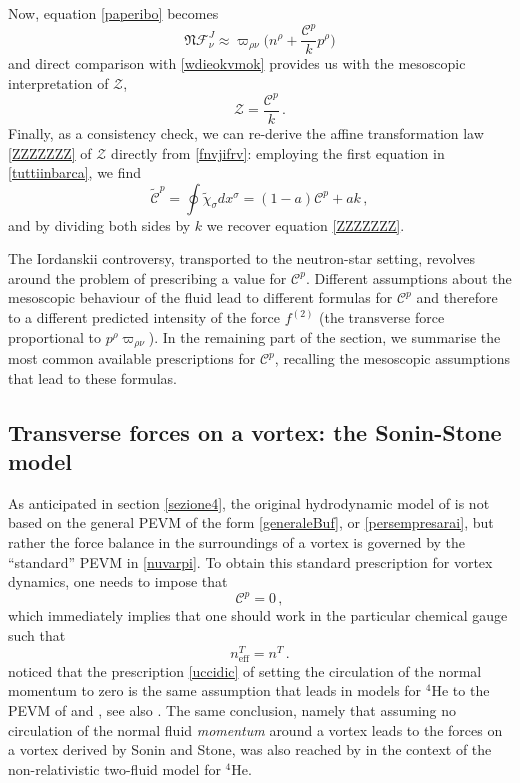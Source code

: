 \documentclass[preprints,article,accept,moreauthors,pdftex]{mdpi}
\begin{document}
Now, equation \eqref{paperibo} becomes
\begin{equation}
\mathfrak{N} \mathcal{F}^J_\nu \approx  \varpi_{\rho \nu} \bigg( n^\rho + \dfrac{\mathcal{C}^p}{k} p^\rho  \bigg) 
\end{equation}
and direct comparison with \eqref{wdieokvmok} provides us with the mesoscopic interpretation of $\mathcal{Z}$, 
\begin{equation}\label{fnvjifrv}
\mathcal{Z} = \dfrac{\mathcal{C}^p}{k} \, .
\end{equation}
Finally, as a consistency check, we can re-derive the affine transformation law \eqref{ZZZZZZZ} of $\mathcal{Z}$   directly from \eqref{fnvjifrv}:
employing the first equation in \eqref{tuttiinbarca}, we find
\begin{equation}\label{cnonc}
\tilde{\mathcal{C}}^p = \oint \tilde{\chi}_\sigma dx^\sigma = (1-a)\mathcal{C}^p +ak \, ,
\end{equation}
and by dividing both sides by $k$ we recover equation \eqref{ZZZZZZZ}.

The Iordanskii controversy, transported to the neutron-star setting, revolves around the problem of prescribing a value for $\mathcal{C}^p$. Different assumptions about the mesoscopic behaviour of the fluid lead to different formulas for $\mathcal{C}^p$ and therefore to a different predicted intensity of the force $f^{(2)}$ (the transverse force proportional to $p^\rho \varpi_{\rho \nu}$). In the remaining part of the section, we summarise the most common available prescriptions for $\mathcal{C}^p$, recalling the mesoscopic assumptions that lead to these formulas. 



\subsection{Transverse forces on a vortex: the Sonin-Stone model}

As anticipated in section \ref{sezione4}, the original hydrodynamic model of \citet{langlois98} is not based on the general PEVM of the form \eqref{generaleBuf}, or \eqref{persempresarai}, but rather the force balance in the surroundings of a vortex is governed by the ``standard'' PEVM in \eqref{nuvarpi}. To obtain this standard prescription for vortex dynamics, one needs to impose that
\begin{equation}
\label{uccidic}
\mathcal{C}^p=0 \, ,
\end{equation}
which immediately implies that one should work in the particular chemical gauge such that 
\begin{equation}
n^T_{\text{eff}} =n^T \, .
\end{equation}
\citet{Carter_Prix_Magnus} noticed  that the prescription \eqref{uccidic} of setting the circulation of the normal momentum to zero is the same assumption that leads in models for $^4$He to the PEVM of \citet{sonin1997PhRvB} and \citet{stone2000}, see also \cite{Sonin_comment_1998,sonin_book_2016}.
The same conclusion, namely that assuming no circulation of the normal fluid \emph{momentum} around a vortex leads to the forces on a vortex derived by Sonin and Stone, was also reached by \citet{Geurst1997} in the context of the non-relativistic two-fluid model for $^4$He. 
\end{document}
